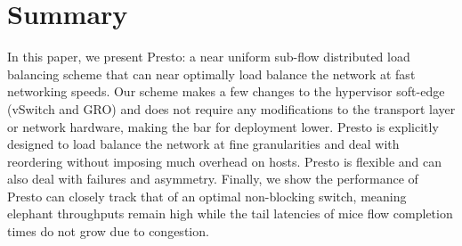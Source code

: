 \section{Summary}
\label{sec:conclusion}
In this paper, we present Presto: a near uniform sub-flow distributed load balancing scheme
that can near optimally load balance the network at fast networking speeds.
Our scheme makes a few changes to the hypervisor soft-edge (vSwitch and GRO)
and does not require any modifications to the transport layer or network hardware, making
the bar for deployment lower. 
Presto is explicitly designed to load balance the network at fine granularities
and deal with reordering without imposing much overhead on hosts. Presto is flexible and can also
deal with failures and asymmetry. Finally, we show the performance of Presto can closely track
that of an optimal non-blocking switch, meaning elephant throughputs remain high while the tail
latencies of mice flow completion times do not grow due to congestion.
